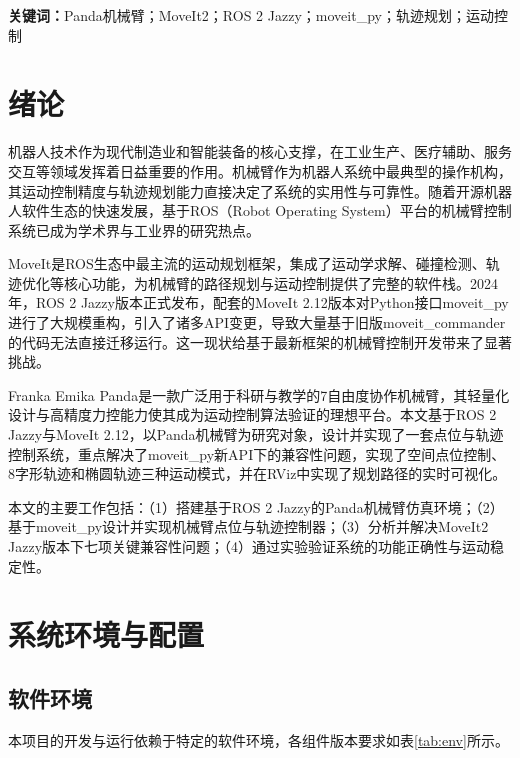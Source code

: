 \documentclass[a4paper,12pt]{ctexart}
\newcommand{\bodytext}{\fontsize{12pt}{20pt}\selectfont\setlength{\parskip}{0pt}}
\begin{document}
\vspace{6pt}
{\fontsize{12pt}{20pt}\selectfont
\textbf{关键词：}Panda机械臂；MoveIt2；ROS 2 Jazzy；moveit\_py；轨迹规划；运动控制
}

\vspace{24pt}



\section{绪论}

\bodytext

机器人技术作为现代制造业和智能装备的核心支撑，在工业生产、医疗辅助、服务交互等领域发挥着日益重要的作用。机械臂作为机器人系统中最典型的操作机构，其运动控制精度与轨迹规划能力直接决定了系统的实用性与可靠性。随着开源机器人软件生态的快速发展，基于ROS（Robot Operating System）平台的机械臂控制系统已成为学术界与工业界的研究热点。

MoveIt是ROS生态中最主流的运动规划框架，集成了运动学求解、碰撞检测、轨迹优化等核心功能，为机械臂的路径规划与运动控制提供了完整的软件栈。2024年，ROS 2 Jazzy版本正式发布，配套的MoveIt 2.12版本对Python接口moveit\_py进行了大规模重构，引入了诸多API变更，导致大量基于旧版moveit\_commander的代码无法直接迁移运行。这一现状给基于最新框架的机械臂控制开发带来了显著挑战。

Franka Emika Panda是一款广泛用于科研与教学的7自由度协作机械臂，其轻量化设计与高精度力控能力使其成为运动控制算法验证的理想平台。本文基于ROS 2 Jazzy与MoveIt 2.12，以Panda机械臂为研究对象，设计并实现了一套点位与轨迹控制系统，重点解决了moveit\_py新API下的兼容性问题，实现了空间点位控制、8字形轨迹和椭圆轨迹三种运动模式，并在RViz中实现了规划路径的实时可视化。

本文的主要工作包括：（1）搭建基于ROS 2 Jazzy的Panda机械臂仿真环境；（2）基于moveit\_py设计并实现机械臂点位与轨迹控制器；（3）分析并解决MoveIt2 Jazzy版本下七项关键兼容性问题；（4）通过实验验证系统的功能正确性与运动稳定性。

\section{系统环境与配置}

\subsection{软件环境}

\bodytext

本项目的开发与运行依赖于特定的软件环境，各组件版本要求如表\ref{tab:env}所示。
\end{document}
